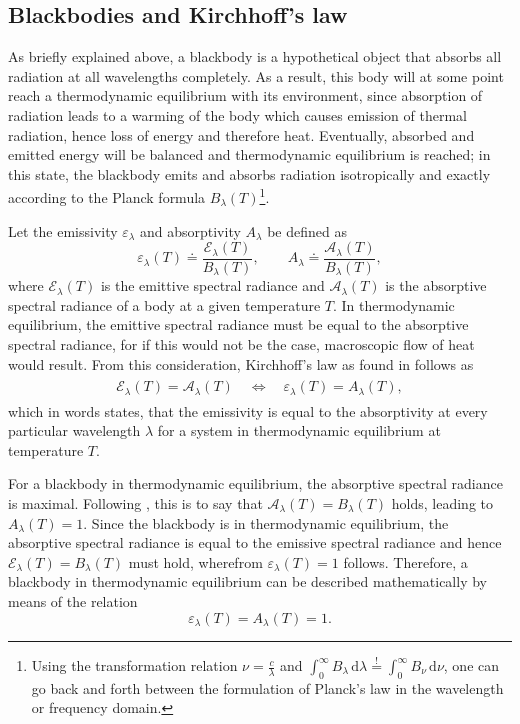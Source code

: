 \documentclass[a4paper,12pt]{report}
\begin{document}
\subsection{Blackbodies and Kirchhoff's law}
As briefly explained above, a blackbody is a hypothetical object that absorbs all radiation at all wavelengths completely. As a result, this body will at some point reach a thermodynamic equilibrium with its environment, since absorption of radiation leads to a warming of the body which causes emission of thermal radiation, hence loss of energy and therefore heat. Eventually, absorbed and emitted energy will be balanced and thermodynamic equilibrium is reached; in this state, the blackbody emits and absorbs radiation isotropically and exactly according to the Planck formula $B_\lambda(T)$\footnote{Using the transformation relation $\nu = \frac{c}{\lambda}$ and $\int_{0}^{\infty} B_\lambda \,\mathrm{d}\lambda \overset{!}{=} \int_{0}^{\infty} B_\nu\,\mathrm{d}\nu$, one can go back and forth between the formulation of Planck's law in the wavelength or frequency domain.}.

Let the emissivity $\varepsilon_\lambda$ and absorptivity $A_\lambda$ be defined as \begin{equation}
\varepsilon_\lambda(T) \doteq \frac{\mathcal{E}_\lambda(T)}{B_\lambda(T)}, \qquad A_\lambda \doteq \frac{\mathcal{A}_\lambda(T)}{B_\lambda(T)},
\end{equation} where $\mathcal{E}_\lambda(T)$ is the emittive spectral radiance and $\mathcal{A}_\lambda(T)$ is the absorptive spectral radiance of a body at a given temperature $T$. In thermodynamic equilibrium, the emittive spectral radiance must be equal to the absorptive spectral radiance, for if this would not be the case, macroscopic flow of heat would result. From this consideration, Kirchhoff's law as found in \cite[p.13]{Liou.2002} follows as
\begin{align}\begin{aligned}
\mathcal{E}_\lambda(T) = \mathcal{A}_\lambda(T) \quad \Leftrightarrow \quad \varepsilon_\lambda(T) = A_\lambda(T),
\end{aligned}\end{align} which in words states, that the emissivity is equal to the absorptivity at every particular wavelength $\lambda$ for a system in thermodynamic equilibrium at temperature $T$.

For a blackbody in thermodynamic equilibrium, the absorptive spectral radiance is maximal. Following \cite[p.14]{Liou.2002}, this is to say that $\mathcal{A}_\lambda(T) = B_\lambda(T)$ holds, leading to $A_\lambda(T) = 1$. Since the blackbody is in thermodynamic equilibrium, the absorptive spectral radiance is equal to the emissive spectral radiance and hence $\mathcal{E}_\lambda(T) = B_\lambda(T)$ must hold, wherefrom  $\varepsilon_\lambda(T) = 1$ follows. Therefore, a blackbody in thermodynamic equilibrium can be described mathematically by means of the relation \begin{equation}
\varepsilon_\lambda(T) = A_\lambda(T) = 1.
\end{equation}
\end{document}
